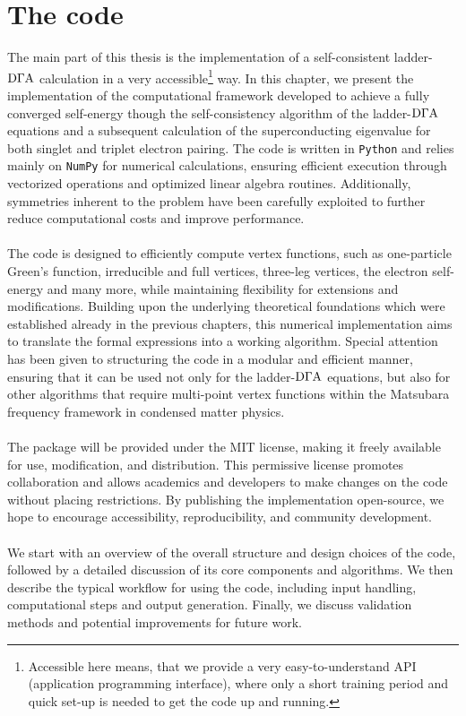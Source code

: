 \documentclass[../../main.tex]{subfiles}
\begin{document}
\chapter{The code}

The main part of this thesis is the implementation of a self-consistent ladder-$\text{D}\Gamma\text{A}$ calculation in a very accessible\footnote{Accessible here means, that we provide a very easy-to-understand API (application programming interface), where only a short training period and quick set-up is needed to get the code up and running.} way. In this chapter, we present the implementation of the computational framework developed to achieve a fully converged self-energy though the self-consistency algorithm of the ladder-$\text{D}\Gamma\text{A}$ equations and a subsequent calculation of the superconducting eigenvalue for both singlet and triplet electron pairing. The code is written in \texttt{Python} and relies mainly on \texttt{NumPy} for numerical calculations, ensuring efficient execution through vectorized operations and optimized linear algebra routines. Additionally, symmetries inherent to the problem have been carefully exploited to further reduce computational costs and improve performance. 
\\\\
The code is designed to efficiently compute vertex functions, such as one-particle Green's function, irreducible and full vertices, three-leg vertices, the electron self-energy and many more, while maintaining flexibility for extensions and modifications. Building upon the underlying theoretical foundations which were established already in the previous chapters, this numerical implementation aims to translate the formal expressions into a working algorithm. Special attention has been given to structuring the code in a modular and efficient manner, ensuring that it can be used not only for the ladder-$\text{D}\Gamma\text{A}$ equations, but also for other algorithms that require multi-point vertex functions within the Matsubara frequency framework in condensed matter physics.
\\\\
The package will be provided under the MIT license, making it freely available for use, modification, and distribution. This permissive license promotes collaboration and allows academics and developers to make changes on the code without placing restrictions. By publishing the implementation open-source, we hope to encourage accessibility, reproducibility, and community development.
\\\\
We start with an overview of the overall structure and design choices of the code, followed by a detailed discussion of its core components and algorithms. We then describe the typical workflow for using the code, including input handling, computational steps and output generation. Finally, we discuss validation methods and potential improvements for future work.
\end{document}

